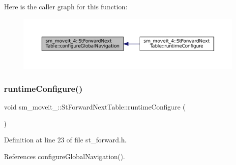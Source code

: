 Here is the caller graph for this function\+:
\nopagebreak
\begin{figure}[H]
\begin{center}
\leavevmode
\includegraphics[width=350pt]{structsm__moveit__4_1_1StForwardNextTable_abda625487098c60f3d0507092aba19ce_icgraph}
\end{center}
\end{figure}
\mbox{\label{structsm__moveit__4_1_1StForwardNextTable_a344aca6962b546a618d94aeb109f3944}} 
\subsubsection{\texorpdfstring{runtime\+Configure()}{runtimeConfigure()}}
{\footnotesize\ttfamily void sm\+\_\+moveit\+\_\+::\+St\+Forward\+Next\+Table\+::runtime\+Configure (\begin{DoxyParamCaption}{ }\end{DoxyParamCaption})\hspace{0.3cm}{\ttfamily [inline]}}



Definition at line 23 of file st\+\_\+forward.\+h.



References configure\+Global\+Navigation().


